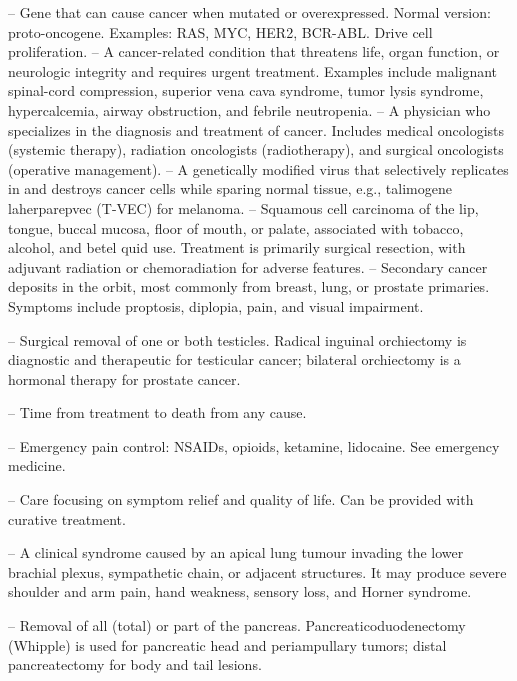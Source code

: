-- Gene that can cause cancer when mutated or overexpressed. Normal version: proto-oncogene. Examples: RAS, MYC, HER2, BCR-ABL. Drive cell proliferation.
-- A cancer-related condition that threatens life, organ function, or neurologic integrity and requires urgent treatment. Examples include malignant spinal-cord compression, superior vena cava syndrome, tumor lysis syndrome, hypercalcemia, airway obstruction, and febrile neutropenia.
-- A physician who specializes in the diagnosis and treatment of cancer. Includes medical oncologists (systemic therapy), radiation oncologists (radiotherapy), and surgical oncologists (operative management).
-- A genetically modified virus that selectively replicates in and destroys cancer cells while sparing normal tissue, e.g., talimogene laherparepvec (T-VEC) for melanoma.
-- Squamous cell carcinoma of the lip, tongue, buccal mucosa, floor of mouth, or palate, associated with tobacco, alcohol, and betel quid use. Treatment is primarily surgical resection, with adjuvant radiation or chemoradiation for adverse features.
-- Secondary cancer deposits in the orbit, most commonly from breast, lung, or prostate primaries. Symptoms include proptosis, diplopia, pain, and visual impairment.

-- Surgical removal of one or both testicles. Radical inguinal orchiectomy is diagnostic and therapeutic for testicular cancer; bilateral orchiectomy is a hormonal therapy for prostate cancer.

-- Time from treatment to death from any cause.

-- Emergency pain control: NSAIDs, opioids, ketamine, lidocaine. See emergency medicine.

-- Care focusing on symptom relief and quality of life. Can be provided with curative treatment.

-- A clinical syndrome caused by an apical lung tumour invading the lower brachial plexus, sympathetic chain, or adjacent structures. It may produce severe shoulder and arm pain, hand weakness, sensory loss, and Horner syndrome.

-- Removal of all (total) or part of the pancreas. Pancreaticoduodenectomy (Whipple) is used for pancreatic head and periampullary tumors; distal pancreatectomy for body and tail lesions.

